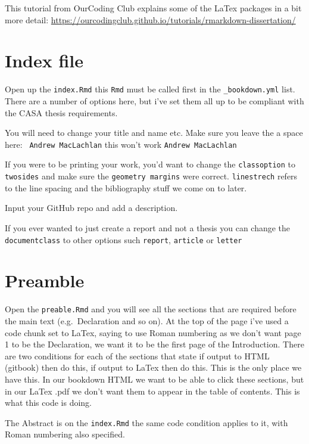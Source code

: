 \documentclass[
  12pt,
  oneside]{book}
\begin{document}
This tutorial from OurCoding Club explains some of the LaTex packages in a bit more detail: \url{https://ourcodingclub.github.io/tutorials/rmarkdown-dissertation/}

\section{Index file}\label{index-file}

Open up the \texttt{index.Rmd} this \texttt{Rmd} must be called first in the \texttt{\_bookdown.yml} list. There are a number of options here, but i've set them all up to be compliant with the CASA thesis requirements.

You will need to change your title and name etc. Make sure you leave the a space here: \texttt{\textbar{}\ Andrew\ MacLachlan} this won't work \texttt{\textbar{}Andrew\ MacLachlan}

If you were to be printing your work, you'd want to change the \texttt{classoption} to \texttt{twosides} and make sure the \texttt{geometry\ margins} were correct. \texttt{linestrech} refers to the line spacing and the bibliography stuff we come on to later.

Input your GitHub repo and add a description.

If you ever wanted to just create a report and not a thesis you can change the \texttt{documentclass} to other options such \texttt{report}, \texttt{article} or \texttt{letter}

\section{Preamble}\label{preamble}

Open the \texttt{preable.Rmd} and you will see all the sections that are required before the main text (e.g.~Declaration and so on). At the top of the page i've used a code chunk set to LaTex, saying to use Roman numbering as we don't want page 1 to be the Declaration, we want it to be the first page of the Introduction. There are two conditions for each of the sections that state if output to HTML (gitbook) then do this, if output to LaTex then do this. This is the only place we have this. In our bookdown HTML we want to be able to click these sections, but in our LaTex .pdf we don't want them to appear in the table of contents. This is what this code is doing.

The Abstract is on the \texttt{index.Rmd} the same code condition applies to it, with Roman numbering also specified.
\end{document}
